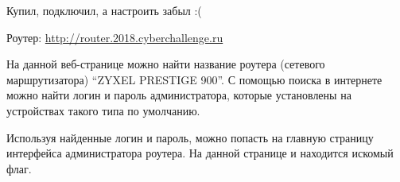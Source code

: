 
Купил, подключил, а настроить забыл :(

Роутер: \url{http://router.2018.cyberchallenge.ru}

\solutionSection

На данной веб-странице можно найти название роутера (сетевого маршрутизатора) “ZYXEL PRESTIGE 900”. С помощью поиска в интернете можно найти логин и пароль администратора, которые установлены на устройствах такого типа по умолчанию.


Используя найденные логин и пароль, можно попасть на главную страницу интерфейса администратора роутера. На данной странице и находится искомый флаг.


